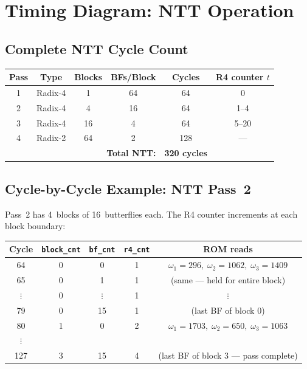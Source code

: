 \documentclass[11pt,a4paper]{article}
\newcommand{\sv}[1]{\texttt{#1}}
\begin{document}
\section{Timing Diagram: NTT Operation}
\label{sec:timing-ntt}

\subsection{Complete NTT Cycle Count}

\begin{center}
\renewcommand{\arraystretch}{1.3}
\begin{tabular}{cccccc}
  \toprule
  \textbf{Pass} & \textbf{Type} & \textbf{Blocks} & \textbf{BFs/Block} & \textbf{Cycles} & \textbf{R4 counter $t$} \\
  \midrule
  1 & Radix-4 & 1  & 64 & 64  & 0 \\
  2 & Radix-4 & 4  & 16 & 64  & 1--4 \\
  3 & Radix-4 & 16 & 4  & 64  & 5--20 \\
  4 & Radix-2 & 64 & 2  & 128 & --- \\
  \midrule
  \multicolumn{4}{r}{\textbf{Total NTT:}} & \textbf{320 cycles} & \\
  \bottomrule
\end{tabular}
\end{center}

\subsection{Cycle-by-Cycle Example: NTT Pass~2}

Pass~2 has 4~blocks of 16~butterflies each. The R4 counter increments at each block boundary:

\begin{center}
\renewcommand{\arraystretch}{1.15}
\begin{tabular}{ccccc}
  \toprule
  \textbf{Cycle} & \sv{block\_cnt} & \sv{bf\_cnt} & \sv{r4\_cnt} & \textbf{ROM reads} \\
  \midrule
  64  & 0 & 0  & 1 & $\omega_1\!=\!296,\; \omega_2\!=\!1062,\; \omega_3\!=\!1409$ \\
  65  & 0 & 1  & 1 & (same --- held for entire block) \\
  $\vdots$ & 0 & $\vdots$ & 1 & $\vdots$ \\
  79  & 0 & 15 & 1 & (last BF of block 0) \\
  80  & 1 & 0  & 2 & $\omega_1\!=\!1703,\; \omega_2\!=\!650,\; \omega_3\!=\!1063$ \\
  $\vdots$ & & & & \\
  127 & 3 & 15 & 4 & (last BF of block 3 --- pass complete) \\
  \bottomrule
\end{tabular}
\end{center}
\end{document}
